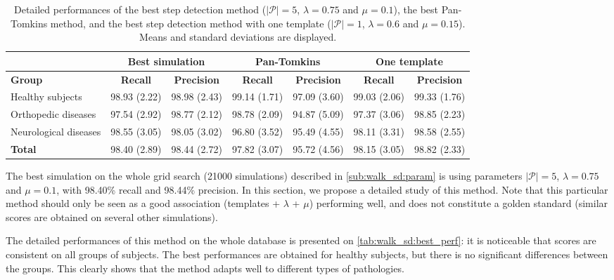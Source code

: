 \documentclass[../thesis.tex]{subfiles}
\begin{document}
\begin{table*}[t]
\begin{center}
\begin{tabular}{|p{5em}||c|c||c|c||c|c|}
\hline
& \multicolumn{2}{c||}{Best simulation} & \multicolumn{2}{c||}{Pan-Tomkins} & \multicolumn{2}{c|}{One template}\\
\hline
\textbf{Group} & \textbf{Recall} & \textbf{Precision} &  \textbf{Recall} & \textbf{Precision} &  \textbf{Recall} & \textbf{Precision}\\
\hline
\hline
Healthy subjects &98.93 (2.22) &  98.98 (2.43) &  99.14 (1.71) &  97.09 (3.60) & 99.03 (2.06) &  99.33 (1.76)\\
\hline
Orthopedic diseases & 97.54 (2.92) &  98.77 (2.12) & 98.78 (2.09) &  94.87 (5.09) & 97.37 (3.06) &  98.85 (2.23)\\
\hline
Neurological diseases & 98.55 (3.05) &  98.05 (3.02) & 96.80 (3.52) &  95.49 (4.55) & 98.11 (3.31) &  98.58 (2.55)\\
\hline
\hline
\textbf{Total} & 98.40 (2.89) &  98.44 (2.72) & 97.82 (3.07) &  95.72 (4.56) & 98.15 (3.05) &  98.82 (2.33)\\
\hline
\end{tabular}            
\caption{Detailed performances of the best step detection method ($|\mathcal{P}| = 5$, $\lambda=0.75$ and $\mu=0.1$), the best Pan-Tomkins method, and the best step detection method with one template ($|\mathcal{P}| = 1$, $\lambda=0.6$ and $\mu=0.15$). Means and standard deviations are displayed.} \label{tab:walk_sd:best_perf}
\end{center}
\end{table*}




The best simulation on the whole grid search (21000 simulations) described in \autoref{sub:walk_sd:param} is using parameters $|\mathcal{P}| = 5$, $\lambda=0.75$ and $\mu=0.1$, with 98.40\% recall and 98.44\% precision. In this section, we propose a detailed study of this method. Note that  this particular method should only be seen as a good association (templates + $\lambda$ + $\mu$) performing well, and does not constitute a golden standard (similar scores are obtained on several other simulations).

The detailed performances of this method on the whole database is presented on \autoref{tab:walk_sd:best_perf}: it is noticeable that scores are consistent on all groups of subjects. The best performances are obtained for healthy subjects, but there is no significant differences between the groups. This clearly shows that the method adapts well to different types of pathologies.
\end{document}
